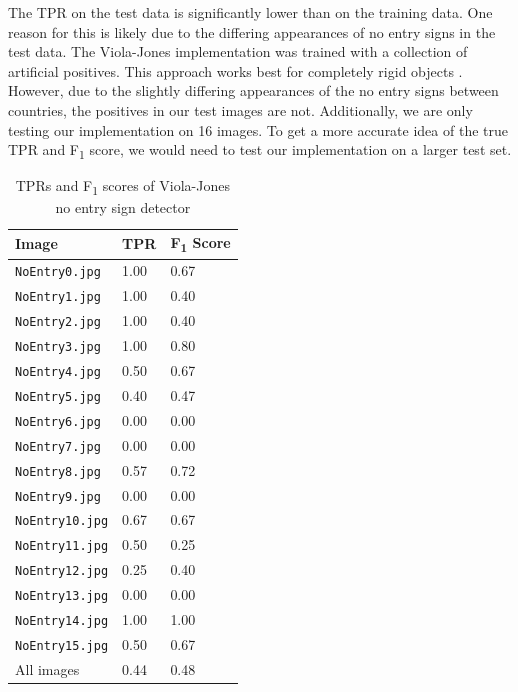 \documentclass[twocolumn, 10pt, a4paper]{article}
\begin{document}
The TPR on the test data is significantly lower than on the training data.
One reason for this is likely due to the differing appearances of no entry signs in the test data.
The Viola-Jones implementation was trained with a collection of artificial positives.
This approach works best for completely rigid objects \cite{training}. 
However, due to the slightly differing appearances of the no entry signs between countries, the positives in our test images are not.
Additionally, we are only testing our implementation on 16 images.
To get a more accurate idea of the true TPR and F\textsubscript{1} score, we would need to test our implementation on a larger test set.

\begin{table}[htbp]
  \begin{center}
  \caption{TPRs and F\textsubscript{1} scores of Viola-Jones no entry sign detector}\label{tab:vj}
  \begin{tabular}{l | l l} 
    \hline\hline
    Image&TPR&F\textsubscript{1} Score\\
    \hline
    \texttt{NoEntry0.jpg}&1.00&0.67\\ 
    \texttt{NoEntry1.jpg}&1.00&0.40\\ 
    \texttt{NoEntry2.jpg}&1.00&0.40\\ 
    \texttt{NoEntry3.jpg}&1.00&0.80\\ 
    \texttt{NoEntry4.jpg}&0.50&0.67\\ 
    \texttt{NoEntry5.jpg}&0.40&0.47\\ 
    \texttt{NoEntry6.jpg}&0.00&0.00\\ 
    \texttt{NoEntry7.jpg}&0.00&0.00\\
    \texttt{NoEntry8.jpg}&0.57&0.72\\ 
    \texttt{NoEntry9.jpg}&0.00&0.00\\ 
    \texttt{NoEntry10.jpg}&0.67&0.67\\ 
    \texttt{NoEntry11.jpg}&0.50&0.25\\ 
    \texttt{NoEntry12.jpg}&0.25&0.40\\ 
    \texttt{NoEntry13.jpg}&0.00&0.00\\ 
    \texttt{NoEntry14.jpg}&1.00&1.00\\ 
    \texttt{NoEntry15.jpg}&0.50&0.67\\ 
    \hdashline
    All images&0.44&0.48\\ 
    \hline
  \end{tabular}
  \end{center}
\end{table} 
\end{document}
